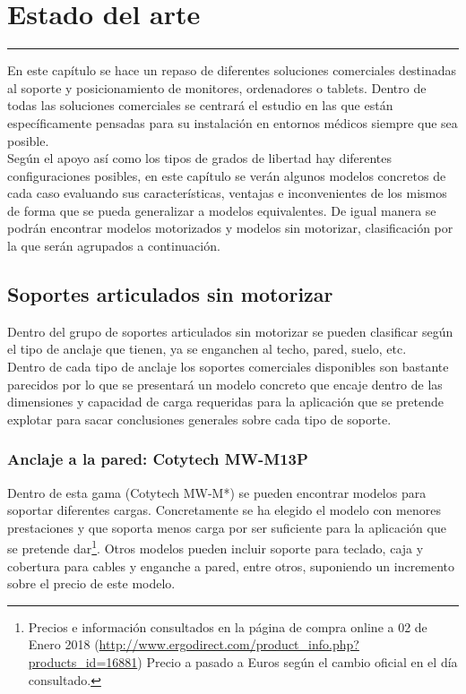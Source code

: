 \chapter{Estado del arte} \label{chap:estadoarte}
\hrule
\vspace{3mm}

En este capítulo se hace un repaso de diferentes soluciones comerciales destinadas al soporte y posicionamiento de monitores, ordenadores o tablets. Dentro de todas las soluciones comerciales se centrará el estudio en las que están específicamente pensadas para su instalación en entornos médicos siempre que sea posible.
\\ 

Según el apoyo así como los tipos de grados de libertad hay diferentes configuraciones posibles, en este capítulo se verán algunos modelos concretos de cada caso evaluando sus características, ventajas e inconvenientes de los mismos de forma que se pueda generalizar a modelos equivalentes. De igual manera se podrán encontrar modelos motorizados y modelos sin motorizar, clasificación por la que serán agrupados a continuación.
\\ 

\section{Soportes articulados sin motorizar}

Dentro del grupo de soportes articulados sin motorizar se pueden clasificar según el tipo de anclaje que tienen, ya se enganchen al techo, pared, suelo, etc. 
\\

Dentro de cada tipo de anclaje los soportes comerciales disponibles son bastante parecidos por lo que se presentará un modelo concreto que encaje dentro de las dimensiones y capacidad de carga requeridas para la aplicación que se pretende explotar para sacar conclusiones generales sobre cada tipo de soporte.
\\ 
 
\subsection{Anclaje a la pared: Cotytech MW-M13P}

Dentro de esta gama (Cotytech MW-M*) se pueden encontrar modelos para soportar diferentes cargas. Concretamente se ha elegido el modelo con menores prestaciones y que soporta menos carga por ser suficiente para la aplicación que se pretende dar\footnote{Precios e información consultados en la página de compra online a 02 de Enero 2018 (\url{http://www.ergodirect.com/product_info.php?products_id=16881}) Precio a pasado a Euros según el cambio oficial en el día consultado.}. Otros modelos pueden incluir soporte para teclado, caja y cobertura para cables y enganche a pared, entre otros, suponiendo un incremento sobre el precio de este modelo.

